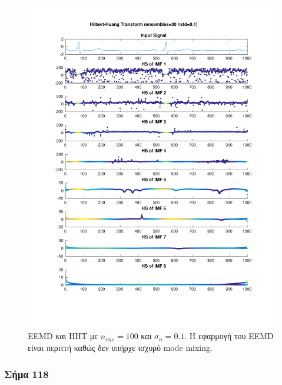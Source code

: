 \documentclass[11pt,a4paper]{article}
\begin{document}
\begin{figure}[H]
\begin{minipage}{0.48\textwidth}
	\includegraphics[width=\textwidth]{fig/123l1_hht_ensemble.pdf}
\end{minipage}
\vfill
\caption{EEMD και HHT με $n_{ens}=100$ και $\sigma_n = 0.1$. Η εφαρμογή του EEMD είναι περιττή καθώς δεν υπήρχε ισχυρό mode mixing.}
\label{fig:123l1_hht_ensemble}
\end{figure}

\subsubsection*{Σήμα 118}
\end{document}
